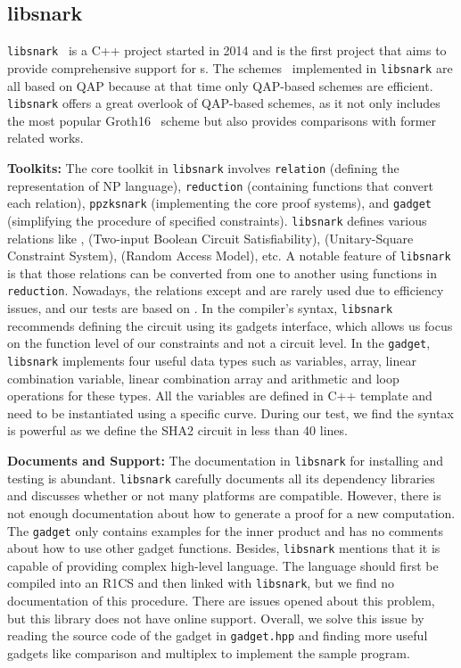 \documentclass[letterpaper,twocolumn,10pt]{article}
\theoremstyle{definition}
\newcommand{\mypara}[1]{\noindent\textbf{{#1: }}}
\newcommand{\zk}{\text{zk-SNARK}\xspace}
\newcommand{\new}[1]{{#1}\xspace}
\newcommand{\lib}[1]{\texttt{#1}\xspace}
\begin{document}
\subsection{libsnark}
\lib{libsnark}~\cite{libsnark} is a C++ project started in 2014 and is the first project that aims to provide comprehensive support for {\zk}s. The schemes~\cite{ben2014succinct,groth2016size,danezis2014square,groth2017snarky,backes2015adsnark,bitansky2013recursive} implemented in \lib{libsnark} are all based on QAP because at that time only QAP-based schemes are efficient. \lib{libsnark} offers a great overlook of QAP-based schemes, as it not only includes the most popular Groth16~\cite{groth2016size} scheme but also provides comparisons with former related works.

\mypara{Toolkits} The core toolkit in \lib{libsnark} involves \texttt{relation} (defining the representation of NP language), \texttt{reduction} (containing functions that convert each relation), \texttt{ppzksnark} (implementing the core proof systems), and \texttt{gadget} (simplifying the procedure of specified constraints). \lib{libsnark} defines various relations like ,  (Two-input Boolean Circuit Satisfiability),  (Unitary-Square Constraint System),  (Random Access Model), etc. A notable feature of \lib{libsnark} is that those relations can be converted from one to another using functions in \texttt{reduction}. Nowadays, the relations except  and  are rarely used due to efficiency issues, and our tests are based on . \new{ In the compiler's syntax, \lib{libsnark} recommends defining the circuit using its gadgets interface, which allows us focus on the function level of our constraints and not a circuit level.
	In the \texttt{gadget}, \lib{libsnark} implements four useful data types such as variables, array, linear combination variable, linear combination array and arithmetic and loop operations for these types. All the variables are defined in C++ template and need to be instantiated using a specific curve. During our test, we find the syntax is powerful as we define the SHA2 circuit in less than 40 lines.}

\mypara{Documents and Support} The documentation in \lib{libsnark} for installing and testing is abundant. \lib{libsnark} carefully documents all its dependency libraries and discusses whether or not many platforms are compatible. However, there is not enough documentation about how to generate a proof for a new computation. The \texttt{gadget} only contains examples for the inner product and has no comments about how to use other gadget functions. Besides, \lib{libsnark} mentions that it is capable of providing complex high-level language. The language should first be compiled into an R1CS and then linked with \lib{libsnark}, but we find no documentation of this procedure. There are issues opened about this problem, but this library does not have online support. Overall, we solve this issue by reading the source code of the gadget in \texttt{gadget.hpp} and finding more useful gadgets like comparison and multiplex to implement the sample program.
\end{document}
